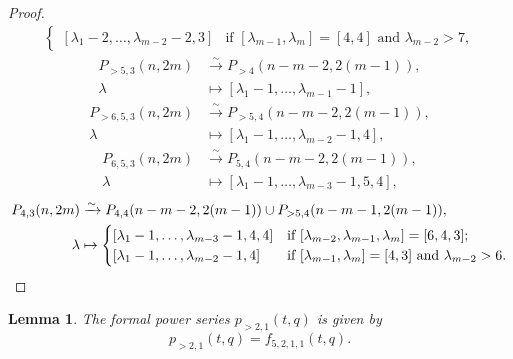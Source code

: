 \documentclass[a4paper, 12pt, reqno]{amsart}
\newtheorem{lemma}[theorem]{Lemma}
\theoremstyle{remark}
\numberwithin{equation}{subsection}
\begin{document}
\begin{proof}
\begin{align*}
\begin{cases}
                [\lambda_1 - 2, \dots, \lambda_{m - 2} - 2, 3] &\text{if }[\lambda_{m - 1}, \lambda_m] = [4, 4]\text{ and }\lambda_{m - 2} > 7,
              \end{cases}
  \end{align*}
  \begin{align*}
    P_{>5, 3}(n, 2m) &\xrightarrow{\sim} P_{>4}(n - m - 2, 2(m - 1)), \\
    \lambda &\mapsto [\lambda_1 - 1, \dots, \lambda_{m - 1} - 1],
  \end{align*}
  \begin{align*}
    P_{>6, 5, 3}(n, 2m) &\xrightarrow{\sim} P_{>5, 4}(n - m - 2, 2(m - 1)), \\
    \lambda &\mapsto [\lambda_1 - 1, \dots, \lambda_{m - 2} - 1, 4],
  \end{align*}
  \begin{align*}
    P_{6, 5, 3}(n, 2m) &\xrightarrow{\sim} P_{5, 4}(n - m - 2, 2(m - 1)), \\
    \lambda &\mapsto [\lambda_1 - 1, \dots, \lambda_{m - 3} - 1, 5, 4],
  \end{align*}
  \begin{align*}
    P_{4, 3}(n, 2m) &\xrightarrow{\sim} P_{4, 4}(n - m - 2, 2(m - 1)) \cup P_{>5, 4}(n - m - 1, 2(m - 1)), \\
    \lambda &\mapsto
              \begin{cases}
                [\lambda_1 - 1, \dots, \lambda_{m - 3} - 1, 4, 4] &\text{if }[\lambda_{m - 2}, \lambda_{m - 1}, \lambda_m] = [6, 4, 3]; \\
                [\lambda_1 - 1, \dots, \lambda_{m - 2} - 1, 4] &\text{if }[\lambda_{m - 1}, \lambda_m] = [4, 3]\text{ and }\lambda_{m - 2} > 6. \qedhere
              \end{cases}
  \end{align*}
\end{proof}

\begin{lemma}
  \label{lmm:27}
  The formal power series $p_{>2, 1}(t, q)$ is given by
  \begin{equation*}
    p_{>2, 1}(t, q) = f_{5, 2, 1, 1}(t, q).
  \end{equation*}
\end{lemma}
\end{document}
